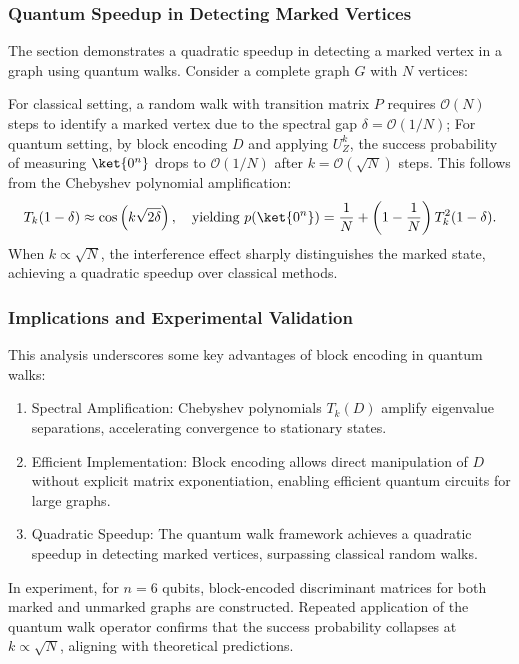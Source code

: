 \documentclass{article}
\begin{document}
    \subsubsection{Quantum Speedup in Detecting Marked Vertices}
    The section demonstrates a quadratic speedup in detecting a marked vertex in a graph using quantum walks. Consider a complete graph $ G $ with $ N $ vertices:

    For classical setting, a random walk with transition matrix $ P $ requires $ \mathcal{O}(N) $ steps to identify a marked vertex due to the spectral gap $ \delta = \mathcal{O}(1/N) $; For quantum setting, by block encoding $ D $ and applying $ U_Z^k $, the success probability of measuring $ \ket{0^n} $ drops to $ \mathcal{O}(1/N) $ after $ k = \mathcal{O}(\sqrt{N}) $ steps. This follows from the Chebyshev polynomial amplification:
    \begin{equation}
        T_k(1 - \delta) \approx \cos\left(k \sqrt{2\delta}\right), \quad \text{yielding } p(\ket{0^n}) = \frac{1}{N} + \left(1 - \frac{1}{N}\right) T_k^2(1 - \delta).
    \end{equation}
    When $ k \propto \sqrt{N} $, the interference effect sharply distinguishes the marked state, achieving a quadratic speedup over classical methods.

    \subsubsection{Implications and Experimental Validation}

    This analysis underscores some key advantages of block encoding in quantum walks:

    \begin{enumerate}
        \item Spectral Amplification: Chebyshev polynomials $ T_k(D) $ amplify eigenvalue separations, accelerating convergence to stationary states.
        \item Efficient Implementation: Block encoding allows direct manipulation of $ D $ without explicit matrix exponentiation, enabling efficient quantum circuits for large graphs.
        \item Quadratic Speedup: The quantum walk framework achieves a quadratic speedup in detecting marked vertices, surpassing classical random walks.
    \end{enumerate}

    In experiment, for $ n = 6 $ qubits, block-encoded discriminant matrices for both marked and unmarked graphs are constructed. Repeated application of the quantum walk operator confirms that the success probability collapses at $ k \propto \sqrt{N} $, aligning with theoretical predictions.
\end{document}
